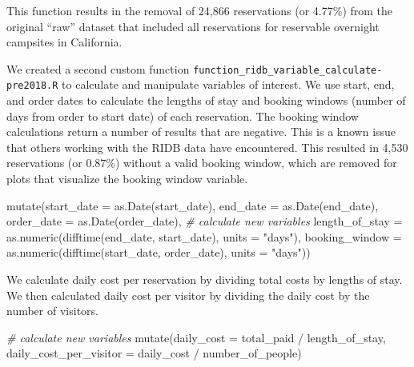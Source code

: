 \documentclass[
  11 pt,
  openany]{book}
\newenvironment{Shaded}{\begin{snugshade}}{\end{snugshade}}
\newcommand{\AttributeTok}[1]{\textcolor[rgb]{0.77,0.63,0.00}{#1}}
\newcommand{\CommentTok}[1]{\textcolor[rgb]{0.56,0.35,0.01}{\textit{#1}}}
\newcommand{\FunctionTok}[1]{\textcolor[rgb]{0.00,0.00,0.00}{#1}}
\newcommand{\NormalTok}[1]{#1}
\newcommand{\SpecialCharTok}[1]{\textcolor[rgb]{0.00,0.00,0.00}{#1}}
\newcommand{\StringTok}[1]{\textcolor[rgb]{0.31,0.60,0.02}{#1}}
\begin{document}
This function results in the removal of 24,866 reservations (or 4.77\%) from the original ``raw'' dataset that included all reservations for reservable overnight campsites in California.

We created a second custom function \texttt{function\_ridb\_variable\_calculate-pre2018.R} to calculate and manipulate variables of interest. We use start, end, and order dates to calculate the lengths of stay and booking windows (number of days from order to start date) of each reservation. The booking window calculations return a number of results that are negative. This is a known issue that others working with the RIDB data have encountered. This resulted in 4,530 reservations (or 0.87\%) without a valid booking window, which are removed for plots that visualize the booking window variable.

\begin{Shaded}
\begin{Highlighting}[]
\FunctionTok{mutate}\NormalTok{(}\AttributeTok{start\_date =} \FunctionTok{as.Date}\NormalTok{(start\_date),}
       \AttributeTok{end\_date =} \FunctionTok{as.Date}\NormalTok{(end\_date),}
       \AttributeTok{order\_date =} \FunctionTok{as.Date}\NormalTok{(order\_date),}
       \CommentTok{\# calculate new variables}
       \AttributeTok{length\_of\_stay =} \FunctionTok{as.numeric}\NormalTok{(}\FunctionTok{difftime}\NormalTok{(end\_date, start\_date), }
                                   \AttributeTok{units =} \StringTok{"days"}\NormalTok{),}
       \AttributeTok{booking\_window =} \FunctionTok{as.numeric}\NormalTok{(}\FunctionTok{difftime}\NormalTok{(start\_date, order\_date), }
                                   \AttributeTok{units =} \StringTok{"days"}\NormalTok{))}
\end{Highlighting}
\end{Shaded}

We calculate daily cost per reservation by dividing total costs by lengths of stay. We then calculated daily cost per visitor by dividing the daily cost by the number of visitors.

\begin{Shaded}
\begin{Highlighting}[]
\CommentTok{\# calculate new variables}
\FunctionTok{mutate}\NormalTok{(}\AttributeTok{daily\_cost =}\NormalTok{ total\_paid }\SpecialCharTok{/}\NormalTok{ length\_of\_stay,}
       \AttributeTok{daily\_cost\_per\_visitor =}\NormalTok{ daily\_cost }\SpecialCharTok{/}\NormalTok{ number\_of\_people)}
\end{Highlighting}
\end{Shaded}
\end{document}
